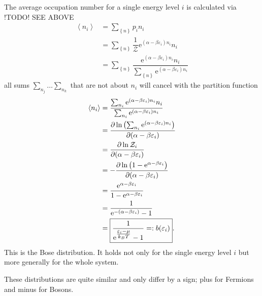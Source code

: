 \documentclass[a4paper,10pt]{article}
\numberwithin{equation}{section}
\begin{document}
\begin{multicols}{2}
The average occupation number for a single energy level $i$ is calculated via !TODO! SEE ABOVE
\begin{align} 
  \left\langle n_i\right\rangle  &= \sum_{ \left\{n\right\}}^{}p_i n_i\\
                                 &= \sum_{ \left\{n\right\}}^{}\dfrac{1}{\mathcal{Z}}\text{e}^{(\alpha -\beta \varepsilon _i)n_i}n_i\\
                                 &= \sum_{ \left\{n\right\}}^{}\dfrac{\text{e}^{(\alpha -\beta \varepsilon _i)n_i}n_i}{\sum_{ \left\{n\right\}}^{}\text{e}^{(\alpha -\beta \varepsilon _i)n_i}}
\end{align} 
all sums $\sum_{n_j}^{}\hdots \sum_{n_k}^{}$ that are not about $n_i$ will cancel with the partition function
\begin{align} 
  \left\langle n_i\right\rangle  &= \dfrac{\sum_{n_i}^{}\text{e}^{(\alpha -\beta \varepsilon _i)n_i}n_i}{\sum_{n_i}^{}\text{e}^{(\alpha -\beta \varepsilon _i)n_i}}\\
                                 &= \diffp[]{\ln\left(\sum_{n_i}^{}\text{e}^{(\alpha -\beta \varepsilon _i)n_i}\right)}{(\alpha -\beta \varepsilon _i)}\\
                                 &= \diffp[]{\ln \mathcal{Z}_i}{(\alpha -\beta \varepsilon _i)}\\
                                 &= -\diffp[]{\ln \left(1-\text{e}^{\alpha -\beta \varepsilon _i}\right)}{(\alpha -\beta \varepsilon _i)}\\
                                 &= \dfrac{\text{e}^{\alpha -\beta \varepsilon _i}}{1-\text{e}^{\alpha -\beta \varepsilon _i}}\\
                                 &=\dfrac{1}{\text{e}^{-(\alpha -\beta \varepsilon _i)}-1}\\
                                 &=\boxed{\dfrac{1}{\text{e}^{\tfrac{\varepsilon _i-\mu }{k_BT}}-1}=:b(\varepsilon _i)}
.\end{align} 
This is the Bose distribution.
It holds not only for the single energy level $i$ but more generally for the whole system.

These distributions are quite similar and only differ by a sign; plus for Fermions and minus for Bosons.



\end{multicols}
\end{document}
